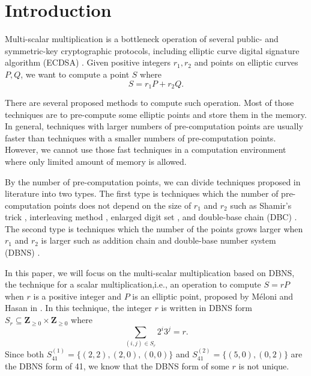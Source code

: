 \section{Introduction}

Multi-scalar multiplication is a bottleneck operation of several public- and symmetric-key cryptographic protocols,
including elliptic curve digital signature algorithm (ECDSA) \cite{ECDSA}.
Given positive integers $r_1, r_2$ and points on elliptic curves $P, Q$,
we want to compute a point $S$ where
$$S = r_1 P + r_2 Q.$$

There are several proposed methods to compute such operation.
Most of those techniques are to pre-compute some elliptic points  and store them in the memory.
In general, techniques with larger numbers of pre-computation points are usually faster than techniques with a smaller numbers of pre-computation points.
However, we cannot use those fast techniques in a computation environment where only limited amount of memory is allowed.

By the number of pre-computation points, we can divide techniques proposed in literature into two types.
The first type is techniques which the number of pre-computation points does not depend on the size of $r_1$ and $r_2$ such as Shamir’s trick \cite{Shamir},
interleaving method \cite{interleaving}, enlarged digit set \cite{enlarged2,enlarged4,enlarged1,enlarged3}, and double-base chain (DBC) \cite{dbc2,dbc3,dbc1}.
The second type is techniques which the number of the points grows larger when $r_1$ and $r_2$ is larger such as addition chain \cite{additionChain1,additionChain2}
and double-base number system (DBNS)  \cite{dbns}.

In this paper, we will focus on the multi-scalar multiplication based on DBNS,
the technique for a scalar multiplication,i.e., an operation to compute $S = rP$ when $r$ is a positive integer and $P$ is an elliptic point, proposed by M\'eloni and Hasan in \cite{dbns}.
In this technique, the integer $r$ is written in DBNS form $S_r \subseteq \mathbf{Z}_{\geq 0} \times \mathbf{Z}_{\geq 0}$ where
$$\sum_{(i,j) \in S_r} 2^i 3^j = r.$$ 
Since both $S^{(1)}_{41} = \{(2,2), (2,0), (0,0)\}$ and $S^{(2)}_{41} = \{(5,0), (0,2)\}$ are the DBNS form of 41, we know that the DBNS form of some $r$ is not unique.

